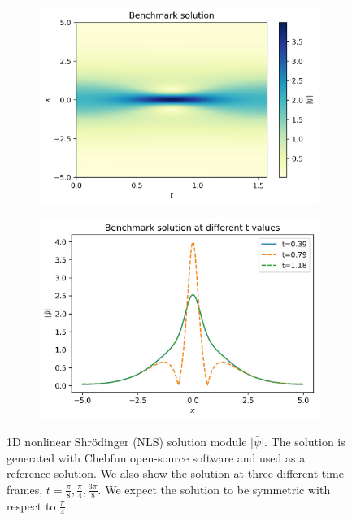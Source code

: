\documentclass[pdflatex,sn-basic]{sn-jnl}%
\theoremstyle{thmstyleone}%
\theoremstyle{thmstyletwo}%
\theoremstyle{thmstylethree}%
\begin{document}
\begin{figure}[hbt!]
     \centering
     \begin{subfigure}[b]{0.49\textwidth}
         \centering
         \includegraphics[width=\textwidth]{U}
     \end{subfigure}
     \hfill
     \begin{subfigure}[b]{0.49\textwidth}
         \centering
         \includegraphics[width=\textwidth]{Bench_Timings50_100_150}
     \end{subfigure}
        \caption{1D nonlinear Shr\"{o}dinger (NLS) solution module $\lvert\bar{\psi}\rvert$. The solution is generated with Chebfun open-source software \citep{Driscoll2014} and used as a reference solution. We also show the solution at three different time frames, $t=\frac{\pi}{8}, \frac{\pi}{4}, \frac{3\pi}{8}$. We expect the solution to be symmetric with respect to $\frac{\pi}{4}$. }
        \label{fig:Chebfun_NLS}
\end{figure}
\end{document}

